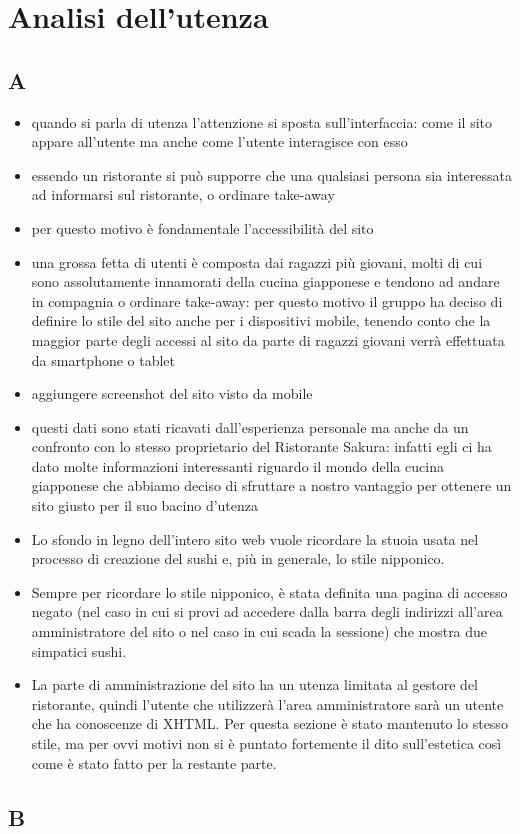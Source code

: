 \documentclass[../relazione.tex]{subfiles}
\begin{document}
\section{Analisi dell'utenza}
	\subsection{A}
	\begin{itemize}
		\item quando si parla di utenza l'attenzione si sposta sull'interfaccia: come il sito appare all'utente ma anche come l'utente interagisce con esso
		\item essendo un ristorante si può supporre che una qualsiasi persona sia interessata ad informarsi sul ristorante, o ordinare take-away
		\item per questo motivo è fondamentale l'accessibilità del sito
		\item una grossa fetta di utenti è composta dai ragazzi più giovani, molti di cui sono assolutamente innamorati della cucina giapponese e tendono ad andare in compagnia o ordinare take-away: per questo motivo il gruppo ha deciso di definire lo stile del sito anche per i dispositivi mobile, tenendo conto che la maggior parte degli accessi al sito da parte di ragazzi giovani verrà effettuata da smartphone o tablet
		\item aggiungere screenshot del sito visto da mobile
		\item questi dati sono stati ricavati dall'esperienza personale ma anche da un confronto con lo stesso proprietario del Ristorante Sakura: infatti egli ci ha dato molte informazioni interessanti riguardo il mondo della cucina giapponese che abbiamo deciso di sfruttare a nostro vantaggio per ottenere un sito giusto per il suo bacino d'utenza
		\item Lo sfondo in legno dell'intero sito web vuole ricordare la stuoia usata nel processo di creazione del sushi e, più in generale, lo stile nipponico.
		\item Sempre per ricordare lo stile nipponico, è stata definita una pagina di accesso negato (nel caso in cui si provi ad accedere dalla barra degli indirizzi all'area amministratore del sito o nel caso in cui scada la sessione) che mostra due simpatici sushi.
		\item La parte di amministrazione del sito ha un utenza limitata al gestore del ristorante, quindi l'utente che utilizzerà l'area amministratore sarà un utente che ha conoscenze di XHTML. Per questa sezione è stato mantenuto lo stesso stile, ma per ovvi motivi non si è puntato fortemente il dito sull'estetica così come è stato fatto per la restante parte. 
	\end{itemize}

	\subsection{B}
\end{document}
